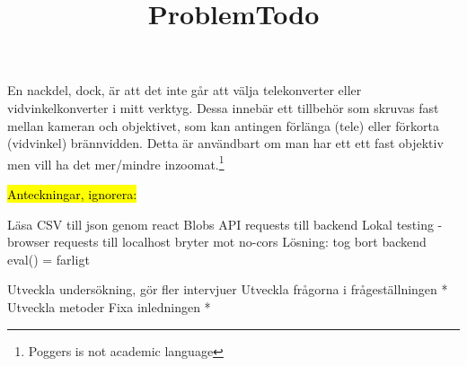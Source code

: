 \documentclass[11pt]{article}
\begin{document}
En nackdel, dock, är att det inte går att välja telekonverter eller 
vidvinkelkonverter i mitt verktyg. Dessa innebär ett tillbehör som skruvas
fast mellan kameran och objektivet, som kan antingen förlänga (tele) eller
förkorta (vidvinkel) brännvidden. Detta är användbart om man har ett ett fast
objektiv men vill ha det mer/mindre inzoomat.\footnote{Poggers is not academic
language}\par

\bigskip
\fussy

\bigskip
\bigskip
\bigskip
\bigskip

\hl{Anteckningar, ignorera:}\par
\title{Problem}
\begin{outline}
    \1 Läsa CSV till json genom react
        \2 Blobs
    \1 API requests till backend
        \2 Lokal testing - browser requests till localhost bryter mot no-cors
        \2 Lösning: tog bort backend
    \1 eval() = farligt
\end{outline}
\bigskip
\title{Todo}
\begin{outline}
    \1 Utveckla undersökning, gör fler intervjuer
    \1 Utveckla frågorna i frågeställningen *
    \1 Utveckla metoder
    \1 Fixa inledningen *
\end{outline}
\end{document}
